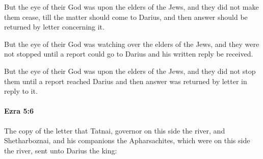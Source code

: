 			\begin{versebox}
					\item[BHS] 
					\item[LXX] 
					\item[ASV] But the eye of their God was upon the elders of the Jews, and they did not make them cease, till the matter should come to Darius, and then answer should be returned by letter concerning it.
					\item[NIV] But the eye of their God was watching over the elders of the Jews, and they were not stopped until a report could go to Darius and his written reply be received.
					\item[NRSV] But the eye of their God was upon the elders of the Jews, and they did not stop them until a report reached Darius and then answer was returned by letter in reply to it.
			\end{versebox}

		\paragraph{Ezra 5:6} %
			\label{EZRA-5-6}

			The copy of the letter that Tatnai, governor on this side the river, and Shetharboznai, and his companions the Apharsachites, which were on this side the river, sent unto Darius the king:

